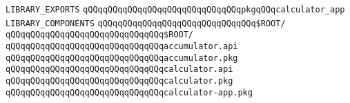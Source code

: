 \label{src/lib/x-kit/tut/calculator/calculator-app.lib}
\verb|LIBRARY_EXPORTS|\newline
\newline
\verb|qQQqqQQqqQQqqQQqqQQqqQQqqQQqqQQqpkgqQQqcalculator_app|\newline
\newline
\verb|LIBRARY_COMPONENTS|\newline
\newline
\verb|qQQqqQQqqQQqqQQqqQQqqQQqqQQqqQQq$ROOT/|\newline
\verb|qQQqqQQqqQQqqQQqqQQqqQQqqQQqqQQq$ROOT/|\newline
\newline
\verb|qQQqqQQqqQQqqQQqqQQqqQQqqQQqqQQqaccumulator.api|\newline
\verb|qQQqqQQqqQQqqQQqqQQqqQQqqQQqqQQqaccumulator.pkg|\newline
\newline
\verb|qQQqqQQqqQQqqQQqqQQqqQQqqQQqqQQqcalculator.api|\newline
\verb|qQQqqQQqqQQqqQQqqQQqqQQqqQQqqQQqcalculator.pkg|\newline
\newline
\verb|qQQqqQQqqQQqqQQqqQQqqQQqqQQqqQQqcalculator-app.pkg|\newline

